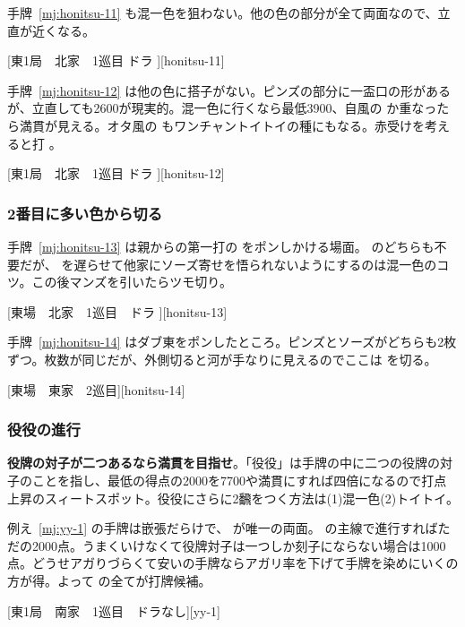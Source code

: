 \documentclass[../nankiru_main.tex]{subfiles}
\begin{document}
手牌~\ref{mj:honitsu-11} も混一色を狙わない。他の色の部分が全て両面なので、立直が近くなる。

[東1局　北家　1巡目 ドラ ][honitsu-11]

手牌~\ref{mj:honitsu-12} は他の色に搭子がない。ピンズの部分に一盃口の形があるが、立直しても2600が現実的。混一色に行くなら最低3900、自風の  か重なったら満貫が見える。オタ風の  もワンチャントイトイの種にもなる。赤受けを考えると打  \citep[][pp.~104--109]{tetsusenryaku}。

[東1局　北家　1巡目 ドラ ][honitsu-12]


\subsubsection*{2番目に多い色から切る}

手牌~\ref{mj:honitsu-13} は親からの第一打の  をポンしかける場面。 のどちらも不要だが、 を遅らせて他家にソーズ寄せを悟られないようにするのは混一色のコツ。この後マンズを引いたらツモ切り\citep[][pp.~118--119]{suzuki}。

[東場　北家　1巡目　ドラ ][honitsu-13]

手牌~\ref{mj:honitsu-14} はダブ東をポンしたところ。ピンズとソーズがどちらも2枚ずつ。枚数が同じだが、外側切ると河が手なりに見えるのでここは  を切る\citep[][pp.~120--121]{suzuki}。

[東場　東家　2巡目][honitsu-14]


\subsubsection{役役の進行}

\textbf{役牌の対子が二つあるなら満貫を目指せ}\citep{yoteru-yakuyaku}。「役役」は手牌の中に二つの役牌の対子のことを指し、最低の得点の2000を7700や満貫にすれば四倍になるので打点上昇のスィートスポット。役役にさらに2飜をつく方法は(1)混一色(2)トイトイ。

例え~\ref{mj:yy-1} の手牌は嵌張だらけで、 が唯一の両面。 の主線で進行すればただの2000点。うまくいけなくて役牌対子は一つしか刻子にならない場合は1000点。どうせアガりづらくて安いの手牌ならアガリ率を下げて手牌を染めにいくの方が得。よって  の全てが打牌候補。

[東1局　南家　1巡目　ドラなし][yy-1]
\end{document}

